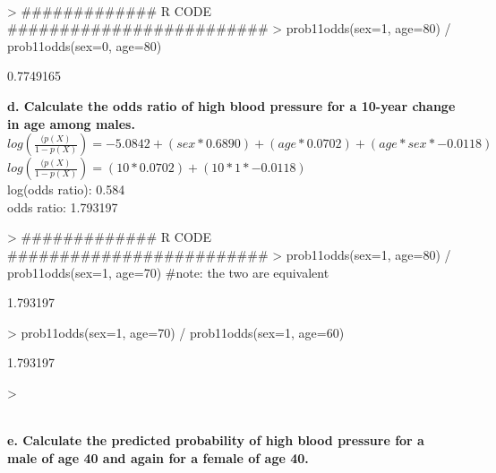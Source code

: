 \documentclass{article}
\begin{document}
 \\

\begin{Schunk}
\begin{Sinput}
> ############# R CODE #########################
> prob11odds(sex=1, age=80) / prob11odds(sex=0, age=80)
\end{Sinput}
\begin{Soutput}
[1] 0.7749165
\end{Soutput}
\end{Schunk}

\noindent \textbf{d. Calculate the odds ratio of high blood pressure for a 10-year change in age among males.  } \\

\noindent $ log(\frac{(p(X)}{1-p(X)}) = -5.0842 + (sex*0.6890) + (age*0.0702) + (age*sex*-0.0118)$\\
\noindent $ log(\frac{(p(X)}{1-p(X)}) =  (10*0.0702) + (10*1*-0.0118)$\\
\noindent log(odds ratio): 0.584 \\
\noindent odds ratio: 1.793197\\

\begin{Schunk}
\begin{Sinput}
> ############# R CODE #########################
> prob11odds(sex=1, age=80) / prob11odds(sex=1, age=70) #note: the two are equivalent
\end{Sinput}
\begin{Soutput}
[1] 1.793197
\end{Soutput}
\begin{Sinput}
> prob11odds(sex=1, age=70) / prob11odds(sex=1, age=60)
\end{Sinput}
\begin{Soutput}
[1] 1.793197
\end{Soutput}
\begin{Sinput}
> 
\end{Sinput}
\end{Schunk}

 \\

\noindent \textbf{e. Calculate the predicted probability of high blood pressure for a male of age 40 and again for a female of age 40.} \\
\end{document}
